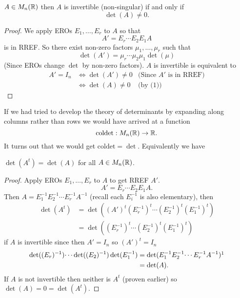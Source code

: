 \documentclass[10pt, a4paper]{article}
\begin{document}
\begin{theorem}
    $A \in M_n(\mathbb{R})$ then $A$ is invertible (non-singular) if and only if
    \[
    \det(A) \neq 0.
    \]
    \begin{proof}
        We apply EROs $E_1,\dotsc, E_r$ to $A$ so that
        \[
        A' = E_r \dotsi E_2E_1A
        \]
        is in RREF.
        So there exist non-zero factors $\mu_1, \dotsc, \mu_r$ such that
        \begin{equation}
        \det(A') = \mu_r\dotsi\mu_2\mu_1\det(\mu)
        \end{equation}
        (Since EROs change $\det$ by non-zero factors).
        $A$ is invertible is equivalent to
        \begin{align*}
            A' = I_n &\iff \det(A') \neq 0 &\text{(Since $A'$ is in RREF)} \\
            &\iff \det(A) \neq 0 &\text{(by (1))}
        \end{align*}
    \end{proof}
\end{theorem}
If we had tried to develop the theory of determinants by expanding along columns rather than rows we would have arrived at a function
\[
\mathrm{coldet}: M_n(\mathbb{R}) \rightarrow \mathbb{R}.
\]
It turns out that we would get $\mathrm{coldet} = \det$.
Equivalently we have
\begin{theorem}
    $\det(A ^ t) = \det(A)$ for all $A \in M_n(\mathbb{R})$.
    \begin{proof}
        Apply EROs $E_1, \dotsc, E_r$ to $A$ to get RREF $A'$.
        \[
        A' = E_r\dotsi E_2E_1A.
        \]
        Then $A = E_1^{-1}E_2^{-1}\dotsi E_r^{-1}A^{-1}$
        (recall each $E_i^{-1}$ is also elementary),
        then
        \begin{align*}
            \det(A ^ t) &= \det((A') ^ t(E_r^{-1}) ^ t \dotsi (E_2^{-1})^t(E_1^{-1})^t) \\
            &= \det((E_r^{-1})^t\dotsi(E_2^{-1})^t(E_1^{-1})^t)
        \end{align*}
        if $A$ is invertible since then $A' = I_n$ so $(A') ^ t = I_n$
        \begin{align*}
            \det((E_r)^{-1})\dotsi\det((E_2)^{-1})\det(E_1^{-1}) &= \det(E_1^{-1}E_2^{-1}\dotsi E_r^{-1}A^{-1})\footnotemark \\
            &= \det(A).
        \end{align*}
        If $A$ is not invertible then neither is $A ^ t$ (proven earlier) so
        $\det(A) = 0 = \det(A ^ t)$.
    \end{proof}
\end{theorem}
\end{document}
